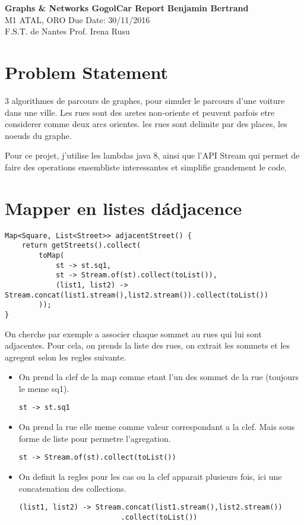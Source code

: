\documentclass[a4paper, 11pt]{article}
\begin{document}
\noindent
\large\textbf{Graphs \& Networks \- GogolCar Report} \hfill \textbf{Benjamin Bertrand} \\
\normalsize M1 ATAL, ORO \hfill Due Date: 30/11/2016 \\
F.S.T. de Nantes \hfill Prof. Irena Rusu\\


\section*{Problem Statement}
3 algorithmes de parcours de graphes, pour simuler le parcours d'une voiture
dans une ville. Les rues sont des aretes non-oriente et peuvent parfois etre
considerer comme deux arcs orientes. les rues sont delimite par des places, les
noeuds du graphe.

Pour ce projet, j'utilise les lambdas java 8, ainsi que l'API Stream qui permet
de faire des operations ensembliste interessantes et simplifie grandement le
code.

\section{Mapper en listes d\'adjacence}
\begin{verbatim}
Map<Square, List<Street>> adjacentStreet() {
    return getStreets().collect(
        toMap(
            st -> st.sq1, 
            st -> Stream.of(st).collect(toList()), 
            (list1, list2) -> Stream.concat(list1.stream(),list2.stream()).collect(toList())
        )); 
}
\end{verbatim}
On cherche par exemple a associer chaque sommet au rues qui lui sont adjacentes.
Pour cela, on prends la liste des rues, on extrait les sommets et les agregent
selon les regles suivante.

\begin{itemize}
  \item On prend la clef de la map comme etant l'un des sommet de la rue (toujours le
meme sq1).
\begin{verbatim}
st -> st.sq1
\end{verbatim}

\item On prend la rue elle meme comme valeur correspondant a la clef. Mais sous
forme de liste pour permetre l'agregation.
\begin{verbatim}
st -> Stream.of(st).collect(toList())
\end{verbatim}

\item On definit la regles pour les cas ou la clef apparait plusieurs fois, ici
une concatenation des collections.
\begin{verbatim}
(list1, list2) -> Stream.concat(list1.stream(),list2.stream())
                        .collect(toList())
\end{verbatim}
\end{itemize}
\end{document}
